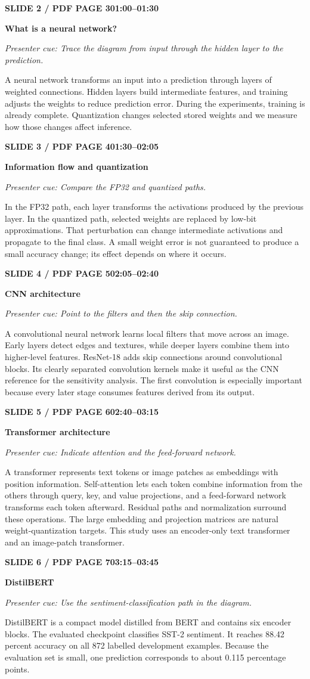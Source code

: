 \documentclass[11pt,a4paper]{article}
\newcommand{\slidetitle}[3]{%
  \vspace{2mm}\noindent
  \colorbox{TUblue}{\parbox{\dimexpr\textwidth-2\fboxsep}{\color{white}\bfseries #1\hfill #2}}%
  \par\textcolor{TUorange}{\bfseries #3}\par
}
\newcommand{\cue}[1]{\textit{\textcolor{TUblue}{Presenter cue: #1}}\par}
\newcommand{\spoken}[1]{#1\par}
\begin{document}
\slidetitle{SLIDE 2 / PDF PAGE 3}{01:00--01:30}{What is a neural network?}
\cue{Trace the diagram from input through the hidden layer to the prediction.}
\spoken{A neural network transforms an input into a prediction through layers of weighted connections. Hidden layers build intermediate features, and training adjusts the weights to reduce prediction error. During the experiments, training is already complete. Quantization changes selected stored weights and we measure how those changes affect inference.}

\slidetitle{SLIDE 3 / PDF PAGE 4}{01:30--02:05}{Information flow and quantization}
\cue{Compare the FP32 and quantized paths.}
\spoken{In the FP32 path, each layer transforms the activations produced by the previous layer. In the quantized path, selected weights are replaced by low-bit approximations. That perturbation can change intermediate activations and propagate to the final class. A small weight error is not guaranteed to produce a small accuracy change; its effect depends on where it occurs.}

\slidetitle{SLIDE 4 / PDF PAGE 5}{02:05--02:40}{CNN architecture}
\cue{Point to the filters and then the skip connection.}
\spoken{A convolutional neural network learns local filters that move across an image. Early layers detect edges and textures, while deeper layers combine them into higher-level features. ResNet-18 adds skip connections around convolutional blocks. Its clearly separated convolution kernels make it useful as the CNN reference for the sensitivity analysis. The first convolution is especially important because every later stage consumes features derived from its output.}

\slidetitle{SLIDE 5 / PDF PAGE 6}{02:40--03:15}{Transformer architecture}
\cue{Indicate attention and the feed-forward network.}
\spoken{A transformer represents text tokens or image patches as embeddings with position information. Self-attention lets each token combine information from the others through query, key, and value projections, and a feed-forward network transforms each token afterward. Residual paths and normalization surround these operations. The large embedding and projection matrices are natural weight-quantization targets. This study uses an encoder-only text transformer and an image-patch transformer.}

\slidetitle{SLIDE 6 / PDF PAGE 7}{03:15--03:45}{DistilBERT}
\cue{Use the sentiment-classification path in the diagram.}
\spoken{DistilBERT is a compact model distilled from BERT and contains six encoder blocks. The evaluated checkpoint classifies SST-2 sentiment. It reaches 88.42 percent accuracy on all 872 labelled development examples. Because the evaluation set is small, one prediction corresponds to about 0.115 percentage points.}
\end{document}
